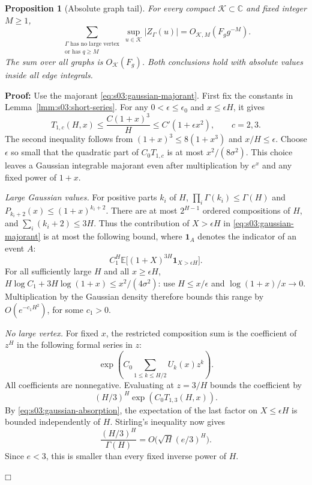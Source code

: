 \documentclass[a4paper,10pt]{article}
\numberwithin{equation}{section}
\theoremstyle{paperplain}
\newtheorem{prp}[thm]{Proposition}
\theoremstyle{paperremark}
\theoremstyle{paperplain}
\newenvironment{prf}{\noindent \textbf{Proof: }}{\hfill $\mdlgwhtsquare$\par\addvspace{0.5\baselineskip}}
\begin{document}
\begin{prp}[Absolute graph tail]
\label{prp:s03:graph-tail}
For every compact $\mathcal K\subset\mathbb C$ and fixed integer
$M\geq1$,
\begin{equation}
\label{eq:s03:graph-tail}
\sum_{\substack{\Gamma\text{ has no large vertex}\\
 \text{or has }q\geq M}}
 \sup_{u\in\mathcal K}|Z_\Gamma(u)|
=O_{\mathcal K,M}(F_g g^{-M}).
\end{equation}
The sum over all graphs is $O_{\mathcal K}(F_g)$.
Both conclusions hold with absolute values inside all edge integrals.
\end{prp}
\begin{prf}
Use the majorant \eqref{eq:s03:gaussian-majorant}. First fix the
constants in Lemma~\ref{lmm:s03:short-series}. For any
$0<\epsilon\leq\epsilon_0$ and $x\leq\epsilon H$, it gives
\begin{equation}
\label{eq:s03:gaussian-absorption}
T_{1,c}(H,x)\leq\frac{C(1+x)^3}{H}
\leq C'(1+\epsilon x^2),\qquad c=2,3.
\end{equation}
The second inequality follows from
$(1+x)^3\leq8(1+x^3)$ and $x/H\leq\epsilon$.
Choose $\epsilon$ so small that the quadratic part of
$C_0T_{1,c}$ is at most $x^2/(8\sigma^2)$. This choice leaves a
Gaussian integrable majorant even after multiplication by $e^x$ and
any fixed power of $1+x$.

\smallskip\noindent
\emph{Large Gaussian values.}
For positive parts $k_i$ of $H$,
$\prod_i\Gamma(k_i)\leq\Gamma(H)$ and
$P_{k_i+2}(x)\leq(1+x)^{k_i+2}$.
There are at most $2^{H-1}$ ordered compositions of $H$, and
$\sum_i(k_i+2)\leq3H$. Thus the contribution of $X>\epsilon H$
in \eqref{eq:s03:gaussian-majorant} is at most the following bound,
where $\mathbf1_A$ denotes the indicator of an event $A$:
\[
C_1^H\mathbb E\bigl[(1+X)^{3H}\mathbf1_{X>\epsilon H}\bigr].
\]
For all sufficiently large $H$ and all $x\geq\epsilon H$,
$H\log C_1+3H\log(1+x)\leq x^2/(4\sigma^2)$:
use $H\leq x/\epsilon$ and $\log(1+x)/x\longrightarrow0$.
Multiplication by the Gaussian density therefore bounds this range
by $O(e^{-c_1H^2})$, for some $c_1>0$.

\smallskip\noindent
\emph{No large vertex.}
For fixed $x$, the restricted composition sum is the coefficient of
$z^H$ in the following formal series in $z$:
\[
\exp\left(C_0\sum_{1\leq k\leq H/2}U_k(x)z^k\right).
\]
All coefficients are nonnegative. Evaluating at $z=3/H$ bounds
the coefficient by
\[
(H/3)^H\exp(C_0T_{1,3}(H,x)).
\]
By \eqref{eq:s03:gaussian-absorption}, the expectation of the last
factor on $X\leq\epsilon H$ is bounded independently of $H$.
Stirling's inequality now gives
\[
\frac{(H/3)^H}{\Gamma(H)}
=O\bigl(\sqrt H(e/3)^H\bigr).
\]
Since $e<3$, this is smaller than every fixed inverse power of $H$.


\end{prf}
\end{document}
